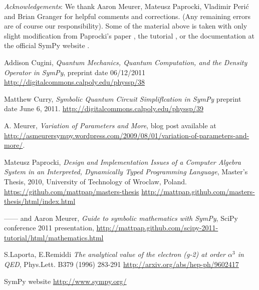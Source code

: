 \documentclass[12pt]{article}
\begin{document}
\vskip 0.3in

\noindent
{\it Acknowledgements}:
We thank Aaron Meurer, Mateusz Paprocki, Vladimir Peri\'c and Brian Granger  
for helpful comments and corrections. (Any remaining errors are of course our
responsibility). Some of the material above is taken 
with only slight modification from Paprocki's paper
\cite{P}, the tutorial \cite{PM}, or the documentation at the official SymPy website
\cite{S}.



\begin{thebibliography}{99}

Addison Cugini,
{\it Quantum Mechanics, Quantum Computation, and the Density Operator in SymPy},
preprint date 06/12/2011
\newline
\url{http://digitalcommons.calpoly.edu/physsp/38}

Matthew Curry,
{\it Symbolic Quantum Circuit Simpliflcation in SymPy}
preprint date June 6, 2011.
\newline
\url{http://digitalcommons.calpoly.edu/physsp/39}

 A. Meurer, 
{\it Variation of Parameters and More}, blog post available at
\newline
\url{http://asmeurersympy.wordpress.com/2009/08/01/variation-of-parameters-and-more/}.

Mateusz Paprocki,
{\it  Design and Implementation Issues of a Computer Algebra System 
in an Interpreted, Dynamically Typed Programming Language},
Master's Thesis, 2010, University of Technology of
Wroclaw,  Poland.
\newline
\url{https://github.com/mattpap/masters-thesis}
\newline
\url{http://mattpap.github.com/masters-thesis/html/index.html}

------ and Aaron Meurer,
{\it Guide to symbolic mathematics with SymPy},
SciPy conference 2011 presentation, 
\newline
\url{http://mattpap.github.com/scipy-2011-tutorial/html/mathematics.html}

S.Laporta, E.Remiddi
{\it The analytical value of the electron (g-2) at order $\alpha^3$ in QED},
Phys.Lett. B379 (1996) 283-291
\newline
\url{http://arxiv.org/abs/hep-ph/9602417}


  SymPy website
\newline
\url{http://www.sympy.org/}



\end{thebibliography}
\end{document}
